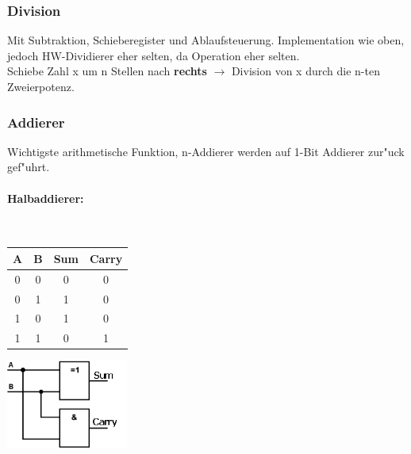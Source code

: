 \subsubsection{Division}
Mit Subtraktion, Schieberegister und Ablaufsteuerung. 
Implementation wie oben, jedoch HW-Dividierer eher selten, da Operation eher selten.\\
Schiebe Zahl x um n Stellen nach \textbf{rechts} $\rightarrow$ Division von x durch die n-ten Zweierpotenz.
\subsubsection{Addierer}
Wichtigste arithmetische Funktion, n-Addierer werden auf 1-Bit Addierer zur"uck gef"uhrt.
\paragraph{Halbaddierer:}~\\
\begin{minipage}{0.5\textwidth}
	\centering
	\begin{tabular}{|c | c | c | c |}
	\hline
	A & B & Sum & Carry\\
	\hline
	0 & 0 & 0 & 0\\
	\hline
	0 & 1 & 1 & 0\\
	\hline
	1 & 0 & 1 & 0\\
	\hline
	1 & 1 & 0 & 1\\
	\hline
	\end{tabular}
\end{minipage}
\begin{minipage}{0.9\textwidth}
	\centering
	\begin{flushleft}
	{\includegraphics[width=0.3\textwidth]{images/Arithmetik/halbaddierer.png}}
	\label{Fig: Halbaddierer}
	\end{flushleft}
\end{minipage}\\ \\

